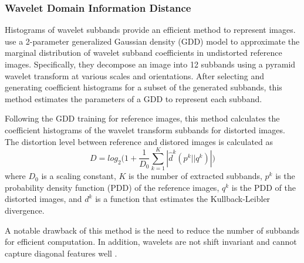 \subsubsection{Wavelet Domain Information Distance}
\label{sub:wavelet_domain_information_distance}
Histograms of wavelet subbands provide an efficient method to represent images.
\cite{wang2005reduced} use a 2-parameter generalized Gaussian density (GDD) model \cite{simoncelli1996noise} to approximate the marginal distribution of wavelet subband coefficients in undistorted reference images.
Specifically, they decompose an image into 12 subbands using a pyramid wavelet transform \cite{simoncelli1992shiftable} at various scales and orientations.
After selecting and generating coefficient histograms for a subset of the generated subbands, this method estimates the parameters of a GDD to represent each subband.

Following the GDD training for reference images, this method calculates the coefficient histograms of the wavelet transform subbands for distorted images.
The distortion level between reference and distored images is calculated as
\begin{equation}
	D = log_2 \Bigg (1 + \frac{1}{D_0} \sum_{k=1}^{K} | \hat d^k(p^k||q^k)| \Bigg )
\end{equation}
where $D_0$ is a scaling constant, $K$ is the number of extracted subbands, $p^k$ is the probability density function (PDD) of the reference images, $q^k$ is the PDD of the distorted images, and $d^k$ is a function that estimates the Kullback-Leibler divergence.

A notable drawback of this method is the need to reduce the number of subbands for efficient computation. 
In addition, wavelets are not shift invariant and cannot capture diagonal features well \cite{kingsbury2001complex}.